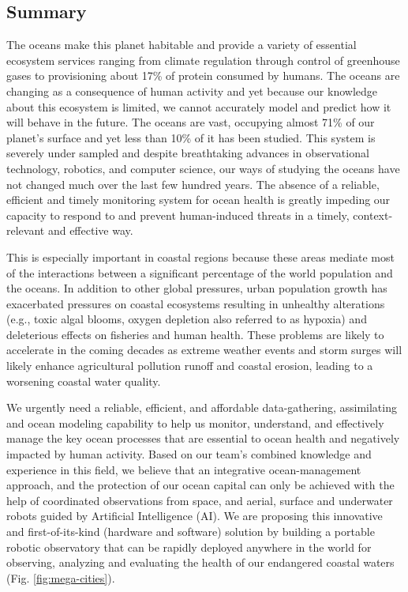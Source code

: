 \setcounter{secnumdepth}{0} 
\subsection{Summary}


The oceans make this planet habitable and provide a variety of
essential ecosystem services ranging from climate regulation through
control of greenhouse gases to provisioning about 17\% of protein
consumed by humans.  The oceans are changing as a consequence of human
activity and yet because our knowledge about this ecosystem is
limited, we cannot accurately model and predict how it will behave in
the future.  The oceans are vast, occupying almost 71\% of our
planet’s surface and yet less than 10\% of it has been studied.  This
system is severely under sampled and despite breathtaking advances in
observational technology, robotics, and computer science, our ways of
studying the oceans have not changed much over the last few hundred
years.
The absence of a reliable, efficient and timely monitoring
system for ocean health is greatly impeding our capacity to respond to
and prevent human-induced threats in a timely, context-relevant and
effective way.

This is especially important in coastal regions because these areas
mediate most of the interactions between a significant percentage of
the world population and the oceans.  In addition to other global
pressures, urban population growth has exacerbated pressures on
coastal ecosystems resulting in unhealthy alterations (e.g., toxic
algal blooms, oxygen depletion also referred to as hypoxia) and
deleterious effects on fisheries and human health. These problems are
likely to accelerate in the coming decades as extreme weather events
and storm surges will likely enhance agricultural pollution runoff and
coastal erosion, leading to a worsening coastal water quality.

We urgently need a reliable, efficient, and affordable data-gathering,
assimilating and ocean modeling capability to help us monitor,
understand, and effectively manage the key ocean processes that are
essential to ocean health and negatively impacted by human
activity. Based on our team's combined knowledge and experience in
this field, we believe that an integrative ocean-management approach,
and the protection of our ocean capital can only be achieved with the
help of coordinated observations from space, and aerial, surface and
underwater robots guided by Artificial Intelligence (AI). We are
proposing this innovative and first-of-its-kind (hardware and
software) solution by building a portable robotic observatory that can
be rapidly deployed anywhere in the world for observing, analyzing and
evaluating the health of our endangered coastal waters
(Fig. \ref{fig:mega-cities}).

